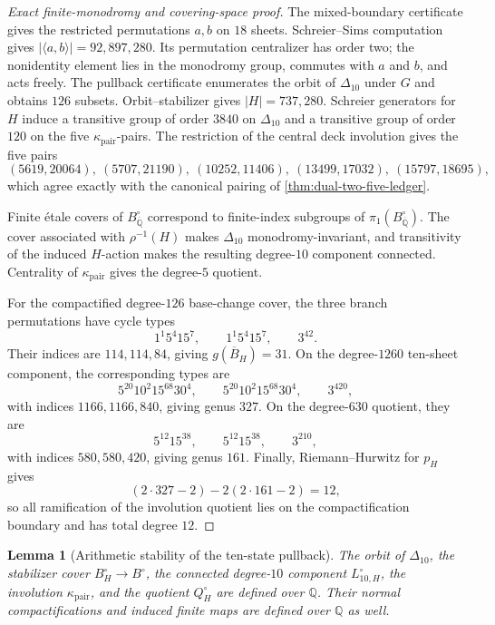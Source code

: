 \documentclass[11pt]{article}
\newtheorem{lemma}[theorem]{Lemma}
\theoremstyle{remark}
\newcommand{\Q}{\mathbb Q}
\begin{document}
\begin{proof}[Exact finite-monodromy and covering-space proof]
The mixed-boundary certificate gives the restricted permutations $a,b$ on $18$ sheets.  Schreier--Sims computation gives $|\langle a,b\rangle|=92{,}897{,}280$.  Its permutation centralizer has order two; the nonidentity element lies in the monodromy group, commutes with $a$ and $b$, and acts freely.  The pullback certificate enumerates the orbit of $\Delta_{10}$ under $G$ and obtains $126$ subsets.  Orbit--stabilizer gives $|H|=737{,}280$.  Schreier generators for $H$ induce a transitive group of order $3840$ on $\Delta_{10}$ and a transitive group of order $120$ on the five $\kappa_{\mathrm{pair}}$-pairs.  The restriction of the central deck involution gives the five pairs
\[
 (5619,20064),\ (5707,21190),\ (10252,11406),\
 (13499,17032),\ (15797,18695),
\]
which agree exactly with the canonical pairing of \cref{thm:dual-two-five-ledger}.

Finite \'etale covers of $B^\circ_{\overline{\Q}}$ correspond to finite-index subgroups of $\pi_1(B^\circ_{\overline{\Q}})$.  The cover associated with $\rho^{-1}(H)$ makes $\Delta_{10}$ monodromy-invariant, and transitivity of the induced $H$-action makes the resulting degree-$10$ component connected.  Centrality of $\kappa_{\mathrm{pair}}$ gives the degree-$5$ quotient.

For the compactified degree-$126$ base-change cover, the three branch permutations have cycle types
\[
 1^1 5^4 15^7,
 \qquad
 1^1 5^4 15^7,
 \qquad
 3^{42}.
\]
Their indices are $114,114,84$, giving $g(\overline B_H)=31$.  On the degree-$1260$ ten-sheet component, the corresponding types are
\[
 5^{20}10^2 15^{68}30^4,
 \qquad
 5^{20}10^2 15^{68}30^4,
 \qquad
 3^{420},
\]
with indices $1166,1166,840$, giving genus $327$.  On the degree-$630$ quotient, they are
\[
 5^{12}15^{38},
 \qquad
 5^{12}15^{38},
 \qquad
 3^{210},
\]
with indices $580,580,420$, giving genus $161$.  Finally, Riemann--Hurwitz for $p_H$ gives
\[
 (2\cdot327-2)-2(2\cdot161-2)=12,
\]
so all ramification of the involution quotient lies on the compactification boundary and has total degree $12$.
\end{proof}

\begin{lemma}[Arithmetic stability of the ten-state pullback]\label{lem:ten-state-arithmetic-stability}
The orbit of $\Delta_{10}$, the stabilizer cover $B_H^\circ\to B^\circ$, the connected degree-$10$ component $L_{10,H}^\circ$, the involution $\kappa_{\mathrm{pair}}$, and the quotient $Q_H^\circ$ are defined over $\Q$.  Their normal compactifications and induced finite maps are defined over $\Q$ as well.
\end{lemma}
\end{document}
